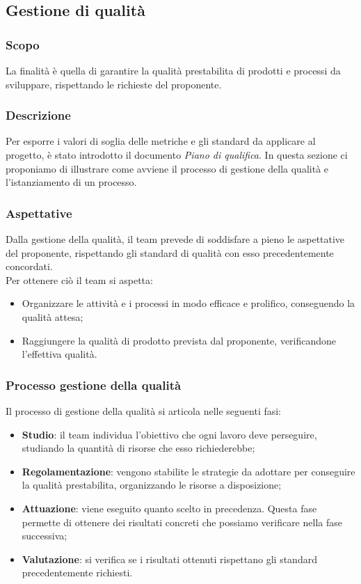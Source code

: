 \subsection{Gestione di qualità}

\subsubsection{Scopo}
La finalità è quella di garantire la qualità prestabilita di prodotti e processi da sviluppare, rispettando le richieste del proponente.

\subsubsection{Descrizione}
Per esporre i valori di soglia delle metriche e gli standard da applicare al progetto, è stato introdotto il documento \textit{Piano di qualifica}.
In questa sezione ci proponiamo di illustrare come avviene il processo di gestione della qualità e l'istanziamento di un processo.

\subsubsection{Aspettative}
Dalla gestione della qualità, il team prevede di soddisfare a pieno le aspettative del proponente, rispettando gli standard di qualità con esso  precedentemente concordati.\\
Per ottenere ciò il team si aspetta:
\begin{itemize}
    \item Organizzare le attività e i processi in modo efficace e prolifico, conseguendo la qualità attesa;
    \item Raggiungere la qualità di prodotto prevista dal proponente, verificandone l'effettiva qualità.
\end{itemize}


\subsubsection{Processo gestione della qualità}
Il processo di gestione della qualità si articola nelle seguenti fasi:
\begin{itemize}
    \item\textbf{Studio}: il team individua l'obiettivo che ogni lavoro deve perseguire, studiando la quantità di risorse che esso richiederebbe;
    \item \textbf{Regolamentazione}: vengono stabilite le strategie da adottare per conseguire la qualità prestabilita, organizzando le risorse a disposizione;
    \item\textbf{Attuazione}: viene eseguito quanto scelto in precedenza. Questa fase permette di ottenere dei risultati concreti che possiamo verificare nella fase successiva;
    \item\textbf{Valutazione}: si verifica se i risultati ottenuti rispettano gli standard precedentemente richiesti.
\end{itemize}


